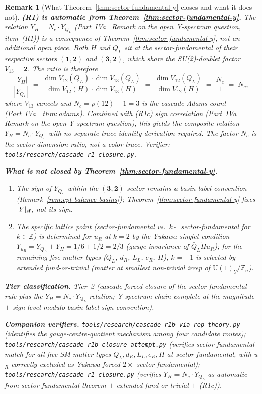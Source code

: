 \documentclass[12pt,a4paper]{article}
\newtheorem*{remark}{Remark}
\begin{document}
\begin{remark}[What Theorem~\ref{thm:sector-fundamental-y} closes and what it does not]
\textbf{(R1) is automatic from Theorem~\ref{thm:sector-fundamental-y}.} The relation $Y_H = N_c\cdot Y_{Q_L}$ (Part~IVa~\cite{part4a} Remark on the open Y-spectrum question, item~(R1)) is a \emph{consequence} of Theorem~\ref{thm:sector-fundamental-y}, not an additional open piece. Both $H$ and $Q_L$ sit at the sector-fundamental of their respective sectors $(\mathbf{1},\mathbf{2})$ and $(\mathbf{3},\mathbf{2})$, which share the SU(2)-doublet factor $V_{13}=\mathbf{2}$. The ratio is therefore
\[
\frac{|Y_H|}{|Y_{Q_L}|} \;=\; \frac{\dim V_{12}(Q_L)\cdot\dim V_{13}(Q_L)}{\dim V_{12}(H)\cdot\dim V_{13}(H)} \;=\; \frac{\dim V_{12}(Q_L)}{\dim V_{12}(H)} \;=\; \frac{N_c}{1} \;=\; N_c,
\]
where $V_{13}$ cancels and $N_c=\rho(12)-1=3$ is the cascade Adams count (Part~IVa~\cite{part4a}~$\mathit{thm{:}adams}$). Combined with (R1c) sign correlation (Part~IVa~\cite{part4a} Remark on the open Y-spectrum question), this yields the composite relation $Y_H=N_c\cdot Y_{Q_L}$ with no separate trace-identity derivation required. The factor $N_c$ is the \emph{sector dimension ratio}, not a color trace. Verifier: \texttt{tools/research/cascade\_r1\_closure.py}.

\textbf{What is not closed by Theorem~\ref{thm:sector-fundamental-y}.}
\begin{enumerate}[label=(\alph*),nosep]
\item The \emph{sign} of $Y_{Q_L}$ within the $(\mathbf{3},\mathbf{2})$-sector remains a basin-label convention (Remark~\ref{rem:cpt-balance-basins}); Theorem~\ref{thm:sector-fundamental-y} fixes $|Y|_{\rm sf}$, not its sign.
\item The \emph{specific lattice point} (sector-fundamental vs.\ $k\cdot$~sector-fundamental for $k\in\mathbb{Z}$) is determined for $u_R$ at $k=2$ by the Yukawa singlet condition $Y_{u_R}=Y_{Q_L}+Y_H=1/6+1/2=2/3$ (gauge invariance of $\bar Q_L\widetilde H u_R$); for the remaining five matter types ($Q_L$, $d_R$, $L_L$, $e_R$, $H$), $k=\pm 1$ is selected by extended fund-or-trivial (matter at smallest non-trivial irrep of $\mathrm{U}(1)_Y/\mathbb{Z}_n$).
\end{enumerate}

\textbf{Tier classification.} Tier~2 (cascade-forced closure of the sector-fundamental rule plus the $Y_H=N_c\cdot Y_{Q_L}$ relation; Y-spectrum chain complete at the magnitude $+$ sign level modulo basin-label sign convention).

\textbf{Companion verifiers.}
\texttt{tools/research/cascade\_r1b\_via\_rep\_theory.py} (identifies the gauge-centre-quotient mechanism among four candidate routes);
\texttt{tools/research/cascade\_r1b\_closure\_attempt.py} (verifies sector-fundamental match for all five SM matter types $Q_L, d_R, L_L, e_R, H$ at sector-fundamental, with u$_R$ correctly excluded as Yukawa-forced $2\times$ sector-fundamental);
\texttt{tools/research/cascade\_r1\_closure.py} (verifies $Y_H=N_c\cdot Y_{Q_L}$ as automatic from sector-fundamental theorem $+$ extended fund-or-trivial $+$ (R1c)).
\end{remark}
\end{document}
